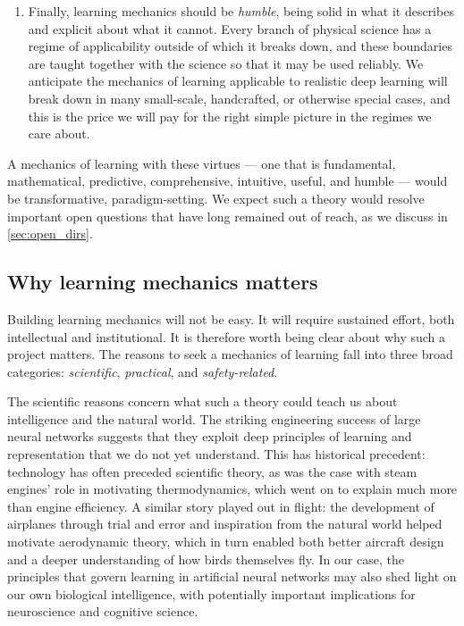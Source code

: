 \begin{enumerate}[itemsep=1ex]
    Concrete goals should include greatly reducing the need for hyperparameter tuning, giving predictive tools for dataset design, and providing rigorous foundations for AI safety work.
    \item Finally, learning mechanics should be \textit{humble}, being solid in what it describes and explicit about what it cannot.
    Every branch of physical science has a regime of applicability outside of which it breaks down, and these boundaries are taught together with the science so that it may be used reliably.
    We anticipate the mechanics of learning applicable to realistic deep learning will break down in many small-scale, handcrafted, or otherwise special cases, and this is the price we will pay for the right simple picture in the regimes we care about.
\end{enumerate}

A mechanics of learning with these virtues --- one that is fundamental, mathematical, predictive, comprehensive, intuitive, useful, and humble --- would be transformative, paradigm-setting.
We expect such a theory would resolve important open questions that have long remained out of reach, as we discuss in \cref{sec:open_dirs}.

\subsection{Why learning mechanics matters}

Building learning mechanics will not be easy.
It will require sustained effort, both intellectual and institutional.
It is therefore worth being clear about why such a project matters.
The reasons to seek a mechanics of learning fall into three broad categories: \textit{scientific}, \textit{practical}, and \textit{safety-related}.

The scientific reasons concern what such a theory could teach us about intelligence and the natural world.
The striking engineering success of large neural networks suggests that they exploit deep principles of learning and representation that we do not yet understand.
This has historical precedent: technology has often preceded scientific theory, as was the case with steam engines' role in motivating thermodynamics, which went on to explain much more than engine efficiency.
A similar story played out in flight: the development of airplanes through trial and error and inspiration from the natural world helped motivate aerodynamic theory, which in turn enabled both better aircraft design and a deeper understanding of how birds themselves fly.
In our case, the principles that govern learning in artificial neural networks may also shed light on our own biological intelligence, with potentially important implications for neuroscience and cognitive science.

